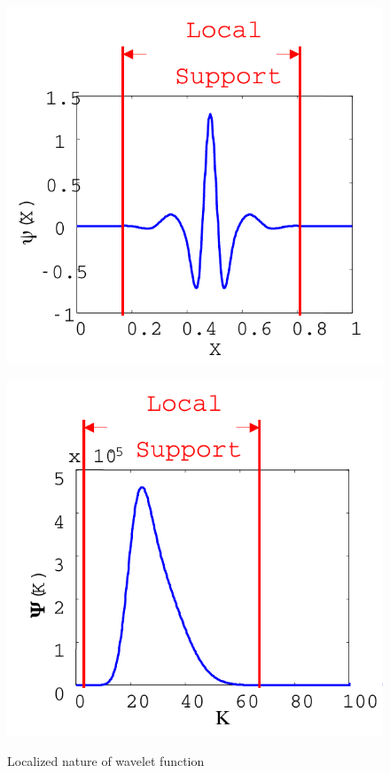\begin{figure}[t]
\begin{minipage}{0.5\linewidth}
\includegraphics[scale=0.7]{fig/wlt.pdf}\\
\end{minipage}
\begin{minipage}{0.5\linewidth}
\includegraphics[scale=0.7]{fig/wlt_fft.pdf}\\
\end{minipage}
\caption{Localized nature of wavelet function} \label{fig:wlt}
\end{figure}

